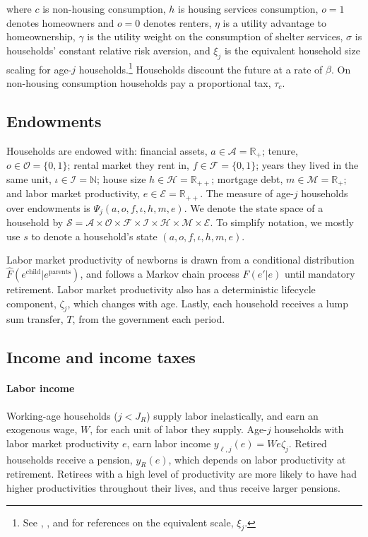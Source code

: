 \documentclass[parskip=full]{article}
\begin{document}

\noindent where $c$ is non-housing consumption, $h$ is housing services consumption, $o=1$ denotes homeowners and $o=0$ denotes renters, $\eta$ is a utility advantage to homeownership, $\gamma$ is the utility weight on the consumption of shelter services, $\sigma$ is households' constant relative risk aversion, and $\xi_{j}$ is the equivalent household size scaling for age-$j$ households.\footnote{See \citet{lm-1980}, \citet{wz-2010}, and \citet{xu-2013} for references on the equivalent scale, $\xi_{j}$.} Households discount the future at a rate of $\beta$. On non-housing consumption households pay a proportional tax, $\tau_{c}$.

\subsection{Endowments}

Households are endowed with: financial assets, $a\in \mathcal{A}=\mathbb{R}_+$; tenure, $o \in \mathcal{O}=\{0,1\}$; rental market they rent in, $f \in \mathcal{F}=\{0,1\}$; years they lived in the same unit, $\iota \in \mathcal{I}=\mathbb{N}$; house size $h\in \mathcal{H}=\mathbb{R}_{++}$; mortgage debt, $m\in \mathcal{M}=\mathbb{R}_+$; and labor market productivity, $e \in\mathcal{E} = \mathbb{R}_{++}$. The measure of age-$j$ households over endowments is $\Psi_{j}(a,o,f,\iota,h,m,e)$. We denote the state space of a household by  $\mathcal{S}=\mathcal{A}\times\mathcal{O}\times\mathcal{F}\times\mathcal{I}\times\mathcal{H}\times\mathcal{M}\times\mathcal{E}$. To simplify notation, we mostly use $s$ to denote a household's state $(a,o,f,\iota,h,m,e)$.

Labor market productivity of newborns is drawn from a conditional distribution $\hat{F}(e^{\mbox{child}}|e^{\mbox{parents}})$, and follows a Markov chain process $F(e'|e)$ until mandatory retirement. Labor market productivity also has a deterministic lifecycle component, $\zeta_j$, which changes with age. Lastly, each household receives a lump sum transfer, $T$, from the government each period.

\subsection{Income and income taxes}\label{subsection:income}

\paragraph{Labor income} Working-age households ($j<J_{R}$) supply labor inelastically, and earn an exogenous wage, $W$, for each unit of labor they supply. Age-$j$ households with labor market productivity $e$, earn labor income $y_{\ell,j}(e)=We\zeta_j$. Retired households receive a pension, $y_{R}(e)$, which depends on labor productivity at retirement. Retirees with a high level of productivity are more likely to have had higher productivities throughout their lives, and thus receive larger pensions. 
\end{document}
